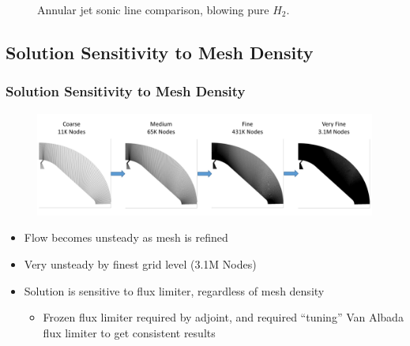 \documentclass{beamer}
\begin{document}
\begin{frame}
{\begin{figure}[h!]
  \caption{Annular jet sonic line comparison, blowing pure $H_2$.}
\end{figure}
}
\end{frame}
\subsection{Solution Sensitivity to Mesh Density}
\begin{frame}
  \frametitle{Solution Sensitivity to Mesh Density}
  \begin{figure}[h]
    \centering
    \includegraphics[width=\textwidth]{figures/mesh-progression.png}
  \end{figure}
  \begin{itemize}
    \item Flow becomes unsteady as mesh is refined
    \item Very unsteady by finest grid level (3.1M Nodes)
    \item Solution is sensitive to flux limiter, regardless of mesh density
      \begin{itemize}
        \item Frozen flux limiter required by adjoint, and required ``tuning''
          Van Albada flux limiter to get consistent results
      \end{itemize}
  \end{itemize}
\end{frame}
\end{document}
